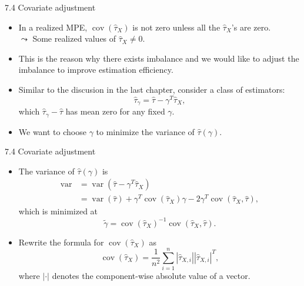 \documentclass[aspectratio=169, 12pt]{beamer}
\begin{document}
\begin{frame}{7.4 Covariate adjustment}
    \begin{itemize}
        \item In a realized MPE, $\operatorname{cov}(\hat{\tau}_X)$ is not zero unless all the $\hat{\tau}_X$'s are zero.\\
        $\leadsto$ Some realized values of $\hat{\tau}_{X}\neq 0$.
        \item This is the reason why there exists imbalance and we would like to adjust the imbalance to improve estimation efficiency.
        \item Similar to the discusion in the last chapter, consider a class of estimators:
        \[
        \hat{\tau}_{\gamma}=\hat{\tau}-\gamma^T\hat{\tau}_X,
        \]
        which $\hat{\tau}_{\gamma}-\hat{\tau}$ has mean zero for any fixed $\gamma$.
        \item We want to choose $\gamma$ to minimize the variance of $\hat{\tau}(\gamma)$.
    \end{itemize}
\end{frame}

\begin{frame}{7.4 Covariate adjustment}
    \begin{itemize}
        \item The variance of $\hat{\tau}(\gamma)$ is
        \begin{align*}
            \operatorname{var} 
            &= \operatorname{var}(\hat{\tau}-\gamma^T\hat{\tau}_X) \\
            &= \operatorname{var}(\hat{\tau}) + \gamma^T\operatorname{cov}(\hat{\tau}_X)\gamma - 2\gamma^T\operatorname{cov}(\hat{\tau}_X,\hat{\tau}),
        \end{align*}
        which is minimized at
        \[
        \tilde{\gamma} = \operatorname{cov}(\hat{\tau}_X)^{-1}\operatorname{cov}(\hat{\tau}_X,\hat{\tau}).
        \]
        \item Rewrite the formula for $\operatorname{cov}(\hat{\tau}_X)$ as $$\operatorname{cov}(\hat{\tau}_X) = \frac{1}{n^2}\sum_{i=1}^{n}|\hat{\tau}_{X,i}||\hat{\tau}_{X,i}|^T,$$
        where $|\cdot|$ denotes the component-wise absolute value of a vector.
    \end{itemize}
\end{frame}
\end{document}
